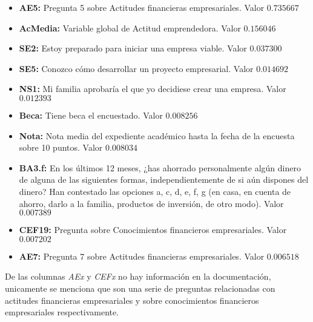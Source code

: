 \begin{itemize}
	\item \textbf{AE5:} Pregunta  5 sobre Actitudes financieras empresariales. Valor $0.735667$
	\item \textbf{AcMedia:} Variable global de Actitud emprendedora. Valor $0.156046$
	\item \textbf{SE2:} Estoy preparado para iniciar una empresa viable. Valor $0.037300$
	\item \textbf{SE5:} Conozco cómo desarrollar un proyecto empresarial. Valor $0.014692$
	\item \textbf{NS1:} Mi familia aprobaría el que yo decidiese crear una empresa. Valor $0.012393$
	\item \textbf{Beca:} Tiene beca el encuestado. Valor $0.008256$
	\item \textbf{Nota:} Nota media del expediente académico hasta la fecha de la encuesta sobre 10 puntos. Valor $0.008034$
	\item \textbf{BA3.f:} En los últimos 12 meses, ¿has ahorrado personalmente algún dinero de alguna de las siguientes formas, independientemente de si aún dispones del dinero? Han contestado las opciones a, c, d, e, f, g (en casa, en cuenta de ahorro, darlo a la familia, productos de inversión, de otro modo). Valor $0.007389$
	\item \textbf{CEF19:} Pregunta sobre Conocimientos financieros empresariales. Valor $0.007202$
	\item \textbf{AE7:} Pregunta 7 sobre Actitudes financieras empresariales. Valor $0.006518$
\end{itemize}
De las columnas \textit{AEx} y \textit{CEFx} no hay información en la documentación, unicamente se menciona que son una serie de preguntas relacionadas con actitudes financieras empresariales y sobre conocimientos financieros empresariales respectivamente.
